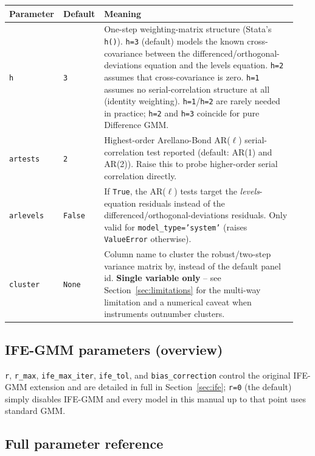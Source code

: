 \documentclass[11pt,a4paper]{article}
\begin{document}
\begin{longtable}{@{}p{0.16\linewidth}p{0.12\linewidth}p{0.66\linewidth}@{}}
\toprule
\textbf{Parameter} & \textbf{Default} & \textbf{Meaning} \\
\midrule
\endhead
\texttt{h} & \texttt{3} & One-step weighting-matrix structure (Stata's
  \texttt{h()}). \texttt{h=3} (default) models the known cross-covariance
  between the differenced/orthogonal-deviations equation and the levels
  equation. \texttt{h=2} assumes that cross-covariance is zero. \texttt{h=1}
  assumes no serial-correlation structure at all (identity weighting).
  \texttt{h=1}/\texttt{h=2} are rarely needed in practice; \texttt{h=2} and
  \texttt{h=3} coincide for pure Difference GMM. \\
\texttt{artests} & \texttt{2} & Highest-order Arellano-Bond AR($\ell$)
  serial-correlation test reported (default: AR(1) and AR(2)). Raise this to
  probe higher-order serial correlation directly. \\
\texttt{arlevels} & \texttt{False} & If \texttt{True}, the AR($\ell$) tests
  target the \emph{levels}-equation residuals instead of the
  differenced/orthogonal-deviations residuals. Only valid for
  \texttt{model\_type='system'} (raises \texttt{ValueError} otherwise). \\
\texttt{cluster} & \texttt{None} & Column name to cluster the robust/two-step
  variance matrix by, instead of the default panel id. \textbf{Single
  variable only} -- see Section~\ref{sec:limitations} for the multi-way
  limitation and a numerical caveat when instruments outnumber clusters. \\
\bottomrule
\end{longtable}

\subsection{IFE-GMM parameters (overview)}

\texttt{r}, \texttt{r\_max}, \texttt{ife\_max\_iter}, \texttt{ife\_tol}, and
\texttt{bias\_correction} control the original IFE-GMM extension and are
detailed in full in Section~\ref{sec:ife}; \texttt{r=0} (the default) simply
disables IFE-GMM and every model in this manual up to that point uses
standard GMM.

\subsection{Full parameter reference}
\label{sec:fullref}
\end{document}

